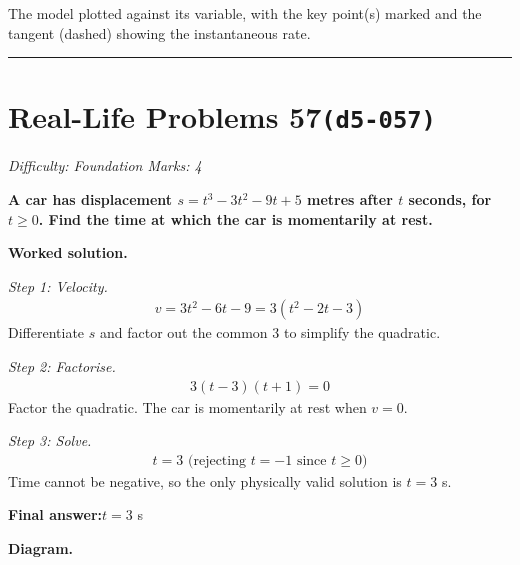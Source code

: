 \documentclass[11pt]{article}
\newcommand{\question}[1]{\par\medskip\noindent\textbf{#1}\par}
\begin{document}
\small The model plotted against its variable, with the key point(s) marked and the tangent (dashed) showing the instantaneous rate.\normalsize

\medskip\hrule

\section*{Real-Life Problems 57\quad\small\texttt{(d5-057)}}
\textit{Difficulty: Foundation \quad\textbar\quad Marks: 4}

\question{A car has displacement \( s = t^3 - 3t^2 - 9t + 5 \) metres after \( t \) seconds, for \( t \ge 0 \). Find the time at which the car is momentarily at rest.}

\textbf{Worked solution.}

\textit{Step 1: Velocity.}
\[\begin{gathered}
v = 3t^2 - 6t - 9 = 3(t^2 - 2t - 3)
\end{gathered}\]
Differentiate \( s \) and factor out the common 3 to simplify the quadratic.

\textit{Step 2: Factorise.}
\[\begin{gathered}
3(t-3)(t+1) = 0
\end{gathered}\]
Factor the quadratic. The car is momentarily at rest when \( v = 0 \).

\textit{Step 3: Solve.}
\[\begin{gathered}
t = 3 \text{ (rejecting } t = -1 \text{ since } t \ge 0)
\end{gathered}\]
Time cannot be negative, so the only physically valid solution is \( t = 3 \) s.

\begin{answerbox}
\textbf{Final answer:}\quad \(\displaystyle  t = 3 \) s
\end{answerbox}
\textbf{Diagram.}
\end{document}
